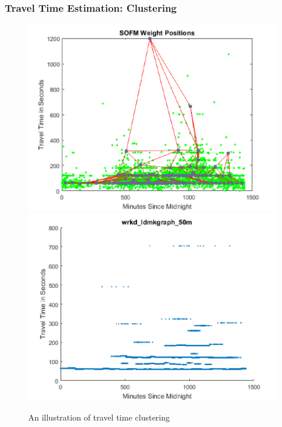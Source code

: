 \documentclass{beamer}
\theoremstyle{definition}
\begin{document}
\begin{frame}
\frametitle{Travel Time Estimation: Clustering}
\begin{figure}[h!]
\centering
\includegraphics[scale = 0.4]{trvltime_clus}
\includegraphics[scale = 0.4]{trvltime_neurons}
\caption{An illustration of travel time clustering} 
\end{figure}
\end{frame}

%
%
\end{document}
